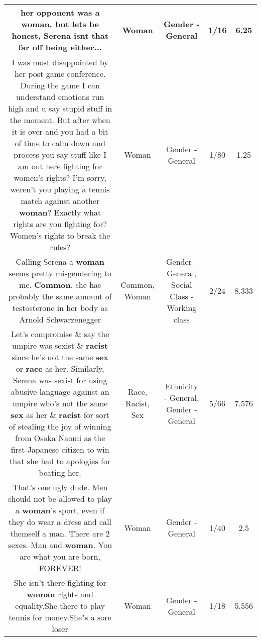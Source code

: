 \documentclass[11pt]{article}
\newlength\mylength
\begin{document}
\begin{center}
\begin{longtable}{|C{.65\mylength}|C{.30\mylength}|C{.12\mylength}|C{.12\mylength}|C{.12\mylength}|}
  \small her opponent was a \textbf{woman}. but lets be honest, Serena isnt that far off being either...\normalsize   & Woman & Gender - General & 1/16 & 6.25 \\  \hline
  \small I was most disappointed by her post game conference. During the game I can understand emotions run high and u say stupid stuff in the moment. But after when it is over and you had a bit of time to calm down and process you say stuff like I am out here fighting for women's rights? I'm sorry, weren't you playing a tennis match against another \textbf{woman}? Exactly what rights are you fighting for? Women's rights to break the rules?\normalsize   & Woman & Gender - General & 1/80 & 1.25 \\  \hline
  \small Calling Serena a \textbf{woman} seems pretty misgendering to me. \textbf{Common}, she has probably the same amount of testosterone in her body as Arnold Schwarzenegger\normalsize   & Common, Woman & Gender - General, Social Class - Working class & 2/24 & 8.333 \\  \hline
  \small Let's compromise \& say the umpire was sexist \& \textbf{racist} since he's not the same \textbf{sex} or \textbf{race} as her. Similarly, Serena was sexist for using abusive language against an umpire who's not the same \textbf{sex} as her \& \textbf{racist} for sort of stealing the joy of winning from Osaka Naomi as the first Japanese citizen to win that she had to apologies for beating her.\normalsize   & Race, Racist, Sex & Ethnicity - General, Gender - General & 5/66 & 7.576 \\  \hline
  \small That's one ugly dude. Men should not be allowed to play a \textbf{woman}'s sport, even if they do wear a dress and call themself a man. There are 2 sexes. Man and \textbf{woman}. You are what you are born, FOREVER!\normalsize   & Woman & Gender - General & 1/40 & 2.5 \\  \hline
  \small She isn't there fighting for \textbf{woman} rights and equality.She there to play tennis for money.She"s a sore loser\normalsize   & Woman & Gender - General & 1/18 & 5.556 \\  \hline

\end{longtable}
\end{center}
\end{document}
